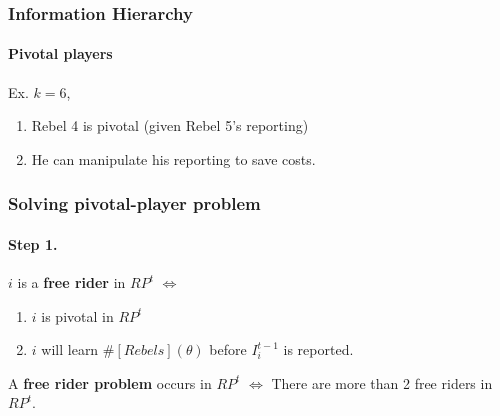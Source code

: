 \documentclass[9pt]{beamer}
\begin{document}
\begin{frame}
  \frametitle{Information Hierarchy}

\framesubtitle{Pivotal players}


Ex. $k=6$, 
\begin{center}
\end{center}
\begin{enumerate}

\item Rebel 4 is pivotal (given Rebel 5's reporting)
\item He can manipulate his reporting to save costs.

\end{enumerate}



\end{frame}


\begin{frame}
  \frametitle{Solving pivotal-player problem}
\framesubtitle{Step 1.}
\begin{definition}
$i$ is a \textbf{free rider} in $RP^t$ $\Leftrightarrow$
\begin{enumerate}

\item $i$ is pivotal in $RP^t$
\item $i$ {will} learn $\#[Rebels](\theta)$ {before} $I^{t-1}_i$ is reported.
\end{enumerate}

\end{definition}

\begin{definition}
A \textbf{free rider problem} occurs in $RP^t$ $\Leftrightarrow$
There are more than 2 free riders in $RP^t$.
\end{definition}



\end{frame}
\end{document}
